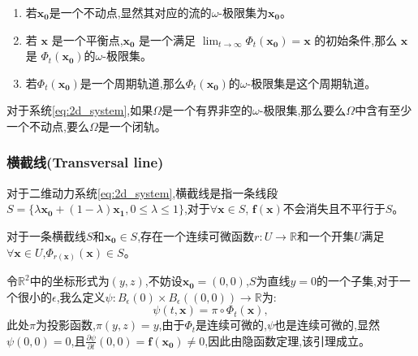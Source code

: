 \begin{exmp}

    \begin{enumerate}
        \item 若$\mathbf{x_0}$是一个不动点,显然其对应的流的$\omega$-极限集为$\mathbf{x_0}$。
        \item 若 $\mathbf{x}$ 是一个平衡点,$\mathbf{x_0}$ 是一个满足 $\lim_{t\to\infty}\Phi_t(\mathbf{x_0}) = \mathbf{x}$ 的初始条件,那么 $\mathbf{x}$ 是 $\Phi_t(\mathbf{x_0})$的$\omega$-极限集。
        \item 若$\Phi_t(\mathbf{x_0})$是一个周期轨道,那么$\Phi_t(\mathbf{x_0})$的$\omega$-极限集是这个周期轨道。
    \end{enumerate}
\end{exmp}
\begin{thm}

    对于系统\ref{eq:2d_system},如果$\Omega$是一个有界非空的$\omega$-极限集,那么要么$\Omega$中含有至少一个不动点,要么$\Omega$是一个闭轨。
\end{thm}
\subsubsection{横截线(Transversal line)}
\begin{defn}[横截线]
    对于二维动力系统\ref{eq:2d_system},横截线是指一条线段$S=\{\lambda\mathbf{x_0}+(1-\lambda)\mathbf{x_1},0\leq \lambda\leq 1\}$,对于$\forall \mathbf{x}\in S$, $\mathbf{f}(\mathbf{x})$不会消失且不平行于$S$。
\end{defn}
\begin{lem}\label{lem:transversal}
对于一条横截线$S$和$\mathbf{x_0}\in S$,存在一个连续可微函数$r:U\to\mathbb{R}$和一个开集$U$满足$\forall \mathbf{x}\in U$,$\Phi_{r(\mathbf{x})}(\mathbf{x})\in S$。
\end{lem}
\begin{pf}
    令$\mathbb{R}^2$中的坐标形式为$(y,z)$,不妨设$\mathbf{x_0}=(0,0)$,$S$为直线$y=0$的一个子集,对于一个很小的$\epsilon$,我么定义$\psi:B_{\epsilon}(0)\times B_{\epsilon}((0,0))\to \mathbb{R}$为:
    \begin{equation}
        \psi(t,\mathbf{x})=\pi\circ\Phi_t(\mathbf{x}),
    \end{equation}
    此处$\pi$为投影函数,$\pi(y,z)=y$,由于$\Phi_t$是连续可微的,$\psi$也是连续可微的,显然$\psi(0,0)=0$,且$\frac{\partial \psi}{\partial t}(0,0)=\mathbf{f}(\mathbf{x_0})\neq 0$,因此由隐函数定理,该引理成立。
\end{pf}
